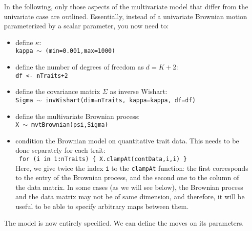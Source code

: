 \documentclass[usletter]{article}
\newcommand{\cmd}[1]{\texttt{#1}}
\begin{document}
In the following, only those aspects of the multivariate model that differ from the univariate case are outlined.
Essentially, instead of a univariate Brownian motion parameterized by a scalar parameter, you now need to:
\begin{itemize}
\item
define $\kappa$:
\\
\cmd{kappa $\sim$ (min=0.001,max=1000)}
\item
define the number of degrees of freedom as $d = K+2$:
\\
\cmd{df <- nTraits+2}
\item
define the covariance matrix $\Sigma$ as inverse Wishart:
\\
\cmd{Sigma $\sim$ invWishart(dim=nTraits, kappa=kappa, df=df)}
\item
define the multivariate Brownian process:
\\
\cmd{X $\sim$ mvtBrownian(psi,Sigma)}
\item
condition the Brownian model on quantitative trait data.
This needs to be done separately for each trait:
\\
\cmd{
for (i in 1:nTraits)    \{
        X.clampAt(contData,i,i)
\}
}
\\
Here, we give twice the index \cmd{i} to the \cmd{clampAt} function: the first corresponds to the entry of the Brownian process, and the second one to the column of the data matrix. In some cases (as we will see below), the Brownian process and the data matrix may not be of same dimension, and therefore, it will be useful to be able to specify arbitrary maps between them.
\end{itemize}
The model is now entirely specified. We can define the moves on its parameters.
\end{document}
